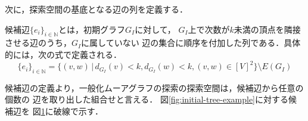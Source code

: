 次に，探索空間の基底となる辺の列を定義する．
\begin{definition}
  \label{def:candidate-edges}
  候補辺$\{e_i\}_{i\in\mathbb{N}}$とは，初期グラフ$G_I$に対して，
  $G_I$上で次数が$k$未満の頂点を隣接させる辺のうち，$G_I$に属していない
  辺の集合に順序を付加した列である．具体的には，次の式で定義される．
  \begin{equation}
    \{e_i\}_{i\in\mathbb{N}} =
    \{(v,w)\,|\,d_{G_I}(v)<k,d_{G_I}(w)<k,(v,w)\in[V]^2\}\setminus E(G_I)
  \end{equation}
\end{definition}
候補辺の定義より，一般化ムーアグラフの探索の探索空間は，候補辺から任意の個数の
辺を取り出した組合せと言える．
図\ref{fig:initial-tree-example}に対する候補辺を
図\ref{fig:feasible-edges-example}に破線で示す．

\begin{figure}
  \centering
  \begin{minipage}{.35\columnwidth}
    \def\svgwidth{\textwidth}
    
    \label{fig:initial-tree-example}
  \end{minipage}
  \hspace{9em}
  \begin{minipage}{.35\columnwidth}
    \def\svgwidth{\textwidth}
    
    \label{fig:feasible-edges-example}
  \end{minipage}
\end{figure}

